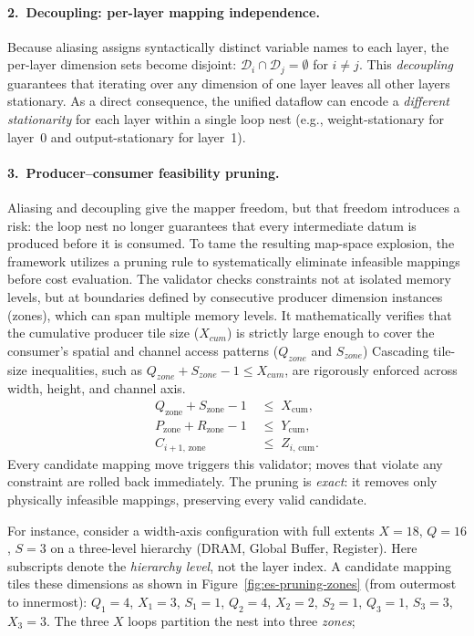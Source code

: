 \documentclass[11pt,a4paper,twocolumn]{article}
\begin{document}
\paragraph{2.\ Decoupling: per-layer mapping independence.}
Because aliasing assigns syntactically distinct variable names to
each layer, the per-layer dimension sets become disjoint:
$\mathcal{D}_i \cap \mathcal{D}_j = \emptyset$ for $i \neq j$.
This \emph{decoupling} guarantees that iterating over any dimension
of one layer leaves all other layers stationary.
As a direct consequence, the unified dataflow can encode a
\emph{different stationarity} for each layer within a single loop
nest (e.g., weight-stationary for layer~0 and output-stationary for
layer~1).

\paragraph{3.\ Producer--consumer feasibility pruning.}
Aliasing and decoupling give the mapper freedom, but that freedom
introduces a risk: the loop nest no longer guarantees
that every intermediate datum is produced before it is consumed.
To tame the resulting map-space explosion, the framework utilizes a pruning rule to systematically eliminate infeasible mappings before cost evaluation.
The validator checks constraints not at isolated memory levels, but at boundaries defined by consecutive producer dimension instances (zones), which can span multiple memory levels.
It mathematically verifies that the cumulative producer tile size ($X_{cum}$) is strictly large enough to cover the consumer's spatial and channel access patterns ($Q_{zone}$ and $S_{zone}$)
Cascading tile-size inequalities, such as $Q_{zone} + S_{zone} - 1 \le X_{cum}$, are rigorously enforced across width, height, and channel axis.
\begin{align}
  Q_{\text{zone}} + S_{\text{zone}} - 1 &\;\le\; X_{\text{cum}},
    \tag{Width} \\[2pt]
  P_{\text{zone}} + R_{\text{zone}} - 1 &\;\le\; Y_{\text{cum}},
    \tag{Height} \\[2pt]
  C_{i+1,\,\text{zone}} &\;\le\; Z_{i,\,\text{cum}}.
    \tag{Channel}
\end{align}
Every candidate mapping move triggers this validator; moves that
violate any constraint are rolled back immediately.
The pruning is \emph{exact}: it removes only physically infeasible
mappings, preserving every valid candidate.

For instance, consider a width-axis configuration with full extents
$X = 18$, $Q = 16$, $S = 3$ on a three-level hierarchy
(DRAM, Global Buffer, Register).
Here subscripts denote the \emph{hierarchy level}, not the layer
index.
A candidate mapping tiles these dimensions as shown in
Figure~\ref{fig:es-pruning-zones} (from outermost to innermost):
$Q_1\!=\!4$, $X_1\!=\!3$, $S_1\!=\!1$, $Q_2\!=\!4$, $X_2\!=\!2$,
$S_2\!=\!1$, $Q_3\!=\!1$, $S_3\!=\!3$, $X_3\!=\!3$.
The three $X$ loops partition the nest into three \emph{zones};
\end{document}
